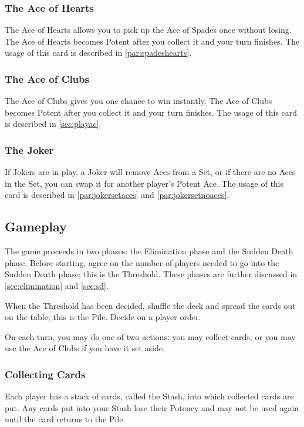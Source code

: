 \documentclass{article}
\begin{document}
\subsubsection{The Ace of Hearts}
The Ace of Hearts allows you to pick up the Ace of Spades once without
losing. The Ace of Hearts becomes Potent after you collect it and your
turn finishes. The usage of this card is described in
\autoref{par:spadeshearts}.

\subsubsection{The Ace of Clubs}
The Ace of Clubs gives you one chance to win instantly. The Ace of Clubs
becomes Potent after you collect it and your turn finishes. The usage of
this card is described in \autoref{sec:playac}.

\subsubsection{The Joker}
If Jokers are in play, a Joker will remove Aces from a Set, or if there
are no Aces in the Set, you can swap it for another player's Potent
Ace. The usage of this card is described in \autoref{par:jokersetaces} and
\autoref{par:jokersetnoaces}.

\subsection{Gameplay}
\label{sec:gameplay}

The game proceeds in two phases: the Elimination phase and the Sudden
Death phase. Before starting, agree on the number of players needed to
go into the Sudden Death phase; this is the Threshold. These phases are
further discussed in \autoref{sec:elimination} and \autoref{sec:sd}.

When the Threshold has been decided, shuffle the deck and spread the
cards out on the table; this is the Pile. Decide on a player order.

On each turn, you may do one of two actions: you may collect cards, or
you may use the Ace of Clubs if you have it set aside.

\subsubsection{Collecting Cards}
\label{sec:collecting}

Each player has a stack of cards, called the Stash, into which collected
cards are put. Any cards put into your Stash lose their Potency and may
not be used again until the card returns to the Pile.
\end{document}
